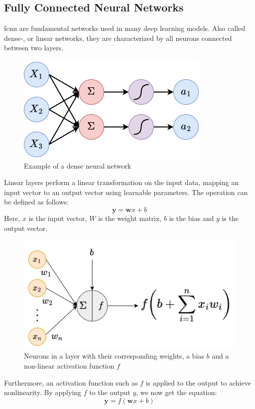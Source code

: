 \subsection{Fully Connected Neural Networks}
\label{back:linear}

\acrfull{fcnn} are fundamental networks used in many deep learning models. Also called dense-, or linear networks, they are characterized by all neurons connected between two layers. 
\begin{figure}[!h]
    \centering
    \includegraphics[width=0.5\linewidth]{figures/linearlayer.png}
    \caption{Example of a dense neural network}
    \label{fig:densenn}
\end{figure}


Linear layers perform a linear transformation on the input data, mapping an input vector to an output vector using learnable parameters. The operation can be defined as follows:
\begin{equation}\label{f:wxb}
    \mathbf{y} = \mathbf{w}x+b
\end{equation}
Here, $x$ is the input vector, $W$ is the weight matrix, $b$ is the bias and $y$ is the output vector.

\begin{figure}[!h]
    \centering
    \includegraphics[width=0.7\linewidth]{figures/dl.png}
    \caption{Neurons in a layer with their corresponding weights, a bias $b$ and a non-linear activation function $f$}
    \label{fig:dl}
\end{figure}

Furthermore, an activation function such as $f$ is applied to the output to achieve nonlinearity. By applying $f$ to the output $y$, we now get the equation:
\begin{equation}\label{f:fwxb}
    \mathbf{y} = f(\mathbf{w}x+b)
\end{equation}


